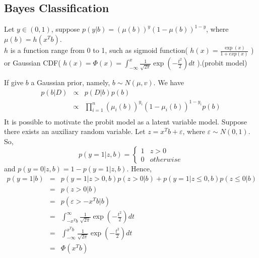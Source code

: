 \documentclass[11pt]{article}
\begin{document}
\subsection{Bayes Classification}
Let $y\in(0,1)$, suppose $p(y|b) = (\mu(b))^y(1-\mu(b))^{1-y}$, where $\mu(b) = h(x^Tb)$. \\$h$ is a function range from 0 to 1, such as sigmoid function( $h(x) = \frac{\exp(x)}{1+exp(x)}$ ) or Gaussian CDF( $h(x) = \Phi(x) = \int_{-\infty}^{x}\frac{1}{\sqrt{2\pi}}\exp(-\frac{t^2}{2})dt$ ).(probit model) 

If give $b$ a Gaussian prior, namely, $b \sim N(\mu, v)$. We have 
\begin{eqnarray*}
p(b|D) &\propto& p(D|b)p(b) \\
&\propto& \prod_{i=1}^{n}(\mu_i(b))^{y_i}(1-\mu_i(b))^{1-y_i}p(b) \\
\end{eqnarray*}
It is possible to motivate the probit model as a latent variable model. Suppose there exists an auxiliary random variable. Let $z =x^Tb+\varepsilon$, where $\varepsilon\sim N(0,1)$.
So, $$p(y=1|z,b) = \left\lbrace\begin{array}{cc}
1 & z>0 \\ 
0 & otherwise
\end{array} \right.$$
and $p(y=0|z,b) = 1- p(y=1|z,b)$.
Hence,
\begin{eqnarray*}
p(y=1|b) &=& p(y=1|z>0,b)p(z>0|b)+ p(y=1|z\leq0,b)p(z\leq0|b) \\
&=& p(z>0|b) \\
&=& p(\varepsilon > -x^Tb|b) \\
&=& \int_{-x^Tb}^{\infty} \frac{1}{\sqrt{2\pi}}\exp(-\frac{t^2}{2})dt \\
&=& \int_{-\infty}^{x^Tb} \frac{1}{\sqrt{2\pi}}\exp(-\frac{t^2}{2})dt \\
&=& \Phi(x^Tb) \\
\end{eqnarray*}
\end{document}

